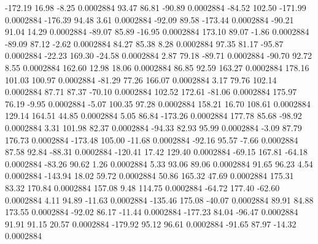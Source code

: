     -172.19       16.98       -8.25     0.0002884
       93.47       86.81      -90.89     0.0002884
      -84.52      102.50     -171.99     0.0002884
     -176.39       94.48        3.61     0.0002884
      -92.09       89.58     -173.44     0.0002884
      -90.21       91.04       14.29     0.0002884
      -89.07       85.89      -16.95     0.0002884
      173.10       89.07       -1.86     0.0002884
      -89.09       87.12       -2.62     0.0002884
       84.27       85.38        8.28     0.0002884
       97.35       81.17      -95.87     0.0002884
      -22.23      169.30      -24.58     0.0002884
        2.87       79.18      -89.71     0.0002884
      -90.70       92.72        8.55     0.0002884
      162.60       12.98       18.06     0.0002884
       86.85       92.59      163.27     0.0002884
      178.16      101.03      100.97     0.0002884
      -81.29       77.26      166.07     0.0002884
        3.17       79.76      102.14     0.0002884
       87.71       87.37      -70.10     0.0002884
      102.52      172.61      -81.06     0.0002884
      175.97       76.19       -9.95     0.0002884
       -5.07      100.35       97.28     0.0002884
      158.21       16.70      108.61     0.0002884
      129.14      164.51       44.85     0.0002884
        5.05       86.84     -173.26     0.0002884
      177.78       85.68      -98.92     0.0002884
        3.31      101.98       82.37     0.0002884
      -94.33       82.93       95.99     0.0002884
       -3.09       87.79      176.73     0.0002884
     -173.48      105.00      -11.68     0.0002884
      -92.16       95.57       -7.66     0.0002884
       87.58       92.84      -88.31     0.0002884
     -120.41       17.42      129.40     0.0002884
      -69.15      167.81      -64.18     0.0002884
      -83.26       90.62        1.26     0.0002884
        5.33       93.06       89.06     0.0002884
       91.65       96.23        4.54     0.0002884
     -143.94       18.02       59.72     0.0002884
       50.86      165.32       47.69     0.0002884
      175.31       83.32      170.84     0.0002884
      157.08        9.48      114.75     0.0002884
      -64.72      177.40      -62.60     0.0002884
        4.11       94.89      -11.63     0.0002884
     -135.46      175.08      -40.07     0.0002884
       89.91       84.88      173.55     0.0002884
      -92.02       86.17      -11.44     0.0002884
     -177.23       84.04      -96.47     0.0002884
       91.91       91.15       20.57     0.0002884
     -179.92       95.12       96.61     0.0002884
      -91.65       87.97      -14.32     0.0002884
